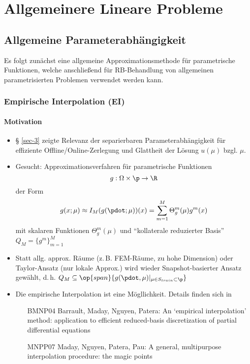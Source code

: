 \section{Allgemeinere Lineare Probleme}
\label{sec-4}

\subsection{Allgemeine Parameterabhängigkeit}
\label{sec-4.1}

Es folgt zunächst eine allgemeine Approximationsmethode für parametrische Funktionen, welche anschließend für RB-Behandlung von allgemeinen parametrisierten Problemen verwendet werden kann.

\subsubsection*{Empirische Interpolation (EI)}

\paragraph*{Motivation}

\begin{itemize}
	\item § \ref{sec-3} zeigte Relevanz der separierbaren Parameterabhängigkeit für effiziente Offline/Online-Zerlegung und Glattheit der Lösung $u(\mu)$ bzgl. $\mu$.
	\item Gesucht: Approximationsverfahren für parametrische Funktionen
	\[
		g: \Omega \times \p \rightarrow \R
	\]
	der Form
	\[
		g(x;\mu) \approx I_{M} (g(\pdot;\mu))(x) = \sum\limits_{m=1}^M \Theta_g^m(\mu) g^m(x)
	\]
	mit skalaren Funktionen $\Theta_g^m(\mu)$ und ``kollaterale reduzierter Basis'' $Q_{M} = \{g^m\}_{m=1}^M$
	\item Statt allg. approx. Räume (z.\,B. FEM-Räume, zu hohe Dimension) oder Taylor-Ansatz (nur lokale Approx.) wird wieder Snapshot-basierter Ansatz gewählt, d.\,h. $Q_M \subseteq \op{span} \{g(\pdot,\mu)|_{\mu \in S_{train} \subset \p} \}$
	\item Die empirische Interpolation ist eine Mögllichkeit. Details finden sich in
	\begin{itemize}
		\item [BMNP04] Barrault, Maday, Nguyen, Patera: An ‘empirical interpolation’ method: application to efficient reduced-basis discretization of partial differential equations
		\item [MNPP07] Maday, Nguyen, Patera, Pau: A general, multipurpose interpolation procedure: the magic points
	\end{itemize}
\end{itemize}

